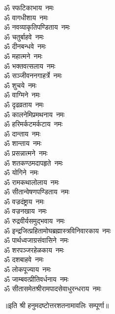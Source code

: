 \begin{multicols}{2}
\begin{flushleft}
ॐ स्फटिकाभाय~नमः\\
ॐ वागधीशाय~नमः\hfill{}\\
ॐ नवव्याकृतिपण्डिताय~नमः\\
ॐ चतुर्बाहवे~नमः\\
ॐ दीनबन्धवे~नमः\\
ॐ महात्मने~नमः\\
ॐ भक्तवत्सलाय~नमः\\
ॐ सञ्जीवननगाहर्त्रे~नमः\\
ॐ शुचये~नमः\\
ॐ वाग्मिने~नमः\\
ॐ दृढव्रताय~नमः\\
ॐ कालनेमिप्रमथनाय~नमः\hfill{}\\
ॐ हरिमर्कटमर्कटाय~नमः\\
ॐ दान्ताय~नमः\\
ॐ शान्ताय~नमः\\
ॐ प्रसन्नात्मने~नमः\\
ॐ शतकण्ठमदापहृते~नमः\\
ॐ योगिने~नमः\\
ॐ रामकथालोलाय~नमः\\
ॐ सीतान्वेषणपण्डिताय~नमः\\
ॐ वज्रदंष्ट्राय~नमः\\
ॐ वज्रनखाय~नमः\hfill{}\\
ॐ रुद्रवीर्यसमुद्भवाय~नमः\\
ॐ इन्द्रजित्प्रहितामोघ\-ब्रह्मास्त्रविनिवारकाय~नमः\\
ॐ पार्थध्वजाग्रसंवासिने~नमः\\
ॐ शरपञ्जरहेळकाय~नमः\\
ॐ दशबाहवे~नमः\\
ॐ लोकपूज्याय~नमः\\
ॐ जाम्बवत्प्रीतिवर्धनाय~नमः\\
ॐ सीतासमेतश्रीराम\-पादसेवाधुरन्धराय~नमः\\
\end{flushleft}
\end{multicols}
॥इति श्री हनुमदष्टोत्तरशतनामावलिः सम्पूर्णा॥
